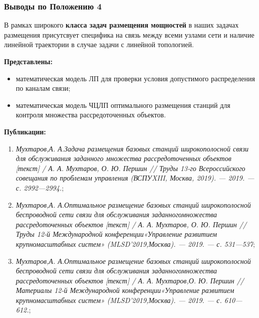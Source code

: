\begin{frame}
    \frametitle{Выводы по Положению 4}
    \fontsize{8pt}{7.2}\selectfont

    В рамках широкого \textbf{класса задач размещения мощностей} в наших задачах размещения присутсвует специфика на связь между всеми узлами сети и наличие линейной траектории в случае задачи с линейной топологией. 
    \bigskip

    \textbf{Представлены:}
    \begin{itemize}
        \item математическая модель ЛП для проверки условия допустимого распределения по каналам связи;
        \item математическая модель ЧЦЛП оптимального размещения станций для контроля множества рассредоточенных объектов.
    \end{itemize}

    \bigskip
    \textbf{Публикации:}
    \begin{minipage}[c]{1\linewidth}
        \fontsize{6pt}{7.2}\selectfont
        \begin{enumerate}
            \item \textit{Мухтаров,А. А.Задача размещения базовых станций широкопо­лосной связи для обслуживания заданного множества рассредото­ченных объектов [текст] / А. А. Мухтаров, О. Ю. Першин // Труды 13-го Всероссийского совещания по проблемам управления (ВСПУXIII, Москва, 2019). — 2019. — с. 2992—2994.};
            
            \item \textit{Мухтаров,А. А.Оптимальное размещение базовых станций широ­кополосной беспроводной сети связи для обслуживания заданногомножества рассредоточенных объектов [текст] / А. А. Мухта­ров, О. Ю. Першин // Труды 12-й Международной конференции«Управление развитием крупномасштабных систем» (MLSD’2019,Москва). — 2019. — с. 531—537};
            
            \item \textit{Мухтаров,А. А.Оптимальное размещение базовых станций широ­кополосной беспроводной сети связи для обслуживания заданногомножества рассредоточенных объектов [текст] / А. А. Мухтаров,О. Ю. Першин // Материалы 12-й Международной конференции«Управление развитием крупномасштабных систем» (MLSD’2019,Москва). — 2019. — с. 610—612.};
            
        \end{enumerate}
    \end{minipage}

\end{frame}



